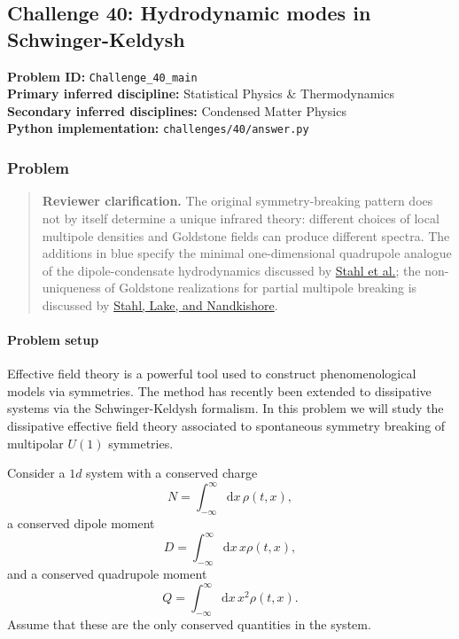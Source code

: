 \subsection[Challenge 40: Hydrodynamic modes in Schwinger-Keldysh]{Challenge 40: Hydrodynamic modes in Schwinger-Keldysh}
\textbf{Problem ID:} \texttt{Challenge\_40\_main}\\
\textbf{Primary inferred discipline:} Statistical Physics \& Thermodynamics\\
\textbf{Secondary inferred disciplines:} Condensed Matter Physics\\
\textbf{Python implementation:} \texttt{challenges/40/answer.py}

\subsubsection*{Problem}

\begin{quote}
\color{blue}
\textbf{Reviewer clarification.}
The original symmetry-breaking pattern does not by itself determine a unique
infrared theory: different choices of local multipole densities and Goldstone
fields can produce different spectra. The additions in blue specify the
minimal one-dimensional quadrupole analogue of the dipole-condensate
hydrodynamics discussed by
\href{https://arxiv.org/abs/2303.09573}{Stahl et al.}; the non-uniqueness of
Goldstone realizations for partial multipole breaking is discussed by
\href{https://arxiv.org/abs/2111.08041}{Stahl, Lake, and Nandkishore}.
\end{quote}

\paragraph*{Problem setup}
Effective field theory is a powerful tool used to construct phenomenological
models via symmetries. The method has recently been extended to dissipative
systems via the Schwinger-Keldysh formalism. In this problem we will study the
dissipative effective field theory associated to spontaneous symmetry breaking
of multipolar $U(1)$ symmetries.

{\color{blue}
Consider a $1d$ system with a conserved charge
\[
N=\int_{-\infty}^{\infty}\mathrm{d}x\,\rho(t,x),
\]
a conserved dipole moment
\[
D=\int_{-\infty}^{\infty}\mathrm{d}x\,x\rho(t,x),
\]
and a conserved quadrupole moment
\[
Q=\int_{-\infty}^{\infty}\mathrm{d}x\,x^2\rho(t,x).
\]
Assume that these are the only conserved quantities in the system.
}

